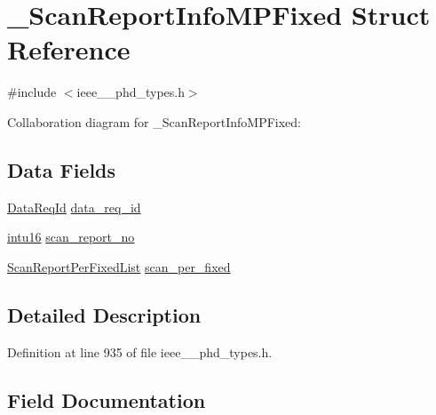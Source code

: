 \hypertarget{struct___scan_report_info_m_p_fixed}{}\section{\+\_\+\+Scan\+Report\+Info\+M\+P\+Fixed Struct Reference}
\label{struct___scan_report_info_m_p_fixed}


{\ttfamily \#include $<$ieee\+\_\+\_\+phd\+\_\+types.\+h$>$}



Collaboration diagram for \+\_\+\+Scan\+Report\+Info\+M\+P\+Fixed\+:
\subsection*{Data Fields}
\begin{DoxyCompactItemize}
\item 
\hyperlink{ieee__11073__phd__types_8h_ab2d118926c6a08395e5d075382450ae0}{Data\+Req\+Id} \hyperlink{struct___scan_report_info_m_p_fixed_a1c786af4096ed61c5f6cfdf27f317b70}{data\+\_\+req\+\_\+id}
\item 
\hyperlink{ieee__11073__phd__types_8h_a3561595d2aa7416532e1c9910abd076d}{intu16} \hyperlink{struct___scan_report_info_m_p_fixed_a21f75132869d4d200ffe01d91b4736d8}{scan\+\_\+report\+\_\+no}
\item 
\hyperlink{ieee__11073__phd__types_8h_adc62466d4539e7eeba98399a0ceb08a5}{Scan\+Report\+Per\+Fixed\+List} \hyperlink{struct___scan_report_info_m_p_fixed_a5979420a126b9179d0a1ca768cf7361e}{scan\+\_\+per\+\_\+fixed}
\end{DoxyCompactItemize}


\subsection{Detailed Description}


Definition at line 935 of file ieee\+\_\+\_\+phd\+\_\+types.\+h.



\subsection{Field Documentation}
\hypertarget{struct___scan_report_info_m_p_fixed_a1c786af4096ed61c5f6cfdf27f317b70}{}

